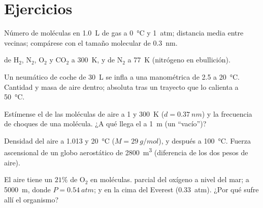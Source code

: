 \section{Ejercicios}

\begin{exercise}[$\star$]\label{exo:b1:kinetic-theory:1}
Número de moléculas en \qty{1.0}{L} de gas a \qty{0}{\degreeCelsius} y
\qty{1}{atm}; distancia media entre vecinas; compárese con el tamaño
molecular de \qty{0.3}{nm}.
\end{exercise}

\begin{exercise}[$\star$]\label{exo:b1:kinetic-theory:2}
 de H$_2$, N$_2$, O$_2$ y CO$_2$ a \qty{300}{K},
y de N$_2$ a \qty{77}{K} (nitrógeno en ebullición).
\end{exercise}

\begin{exercise}[$\star$]\label{exo:b1:kinetic-theory:3}
Un neumático de coche de \qty{30}{L} se infla a una  manométrica de
\qty{2.5}{} a \qty{20}{\degreeCelsius}. Cantidad y masa de aire dentro;
 absoluta tras un trayecto que lo calienta a \qty{50}{\degreeCelsius}.
\end{exercise}

\begin{exercise}[$\star$]\label{exo:b1:kinetic-theory:4}
Estímense el  de las moléculas de aire a \qty{1}{}
y \qty{300}{K} ($d = \qty{0.37}{nm}$) y la frecuencia de choques de una
molécula. ¿A qué  llega el  a \qty{1}{m} (un ``vacío'')?
\end{exercise}

\begin{exercise}[$\star\star$]\label{exo:b1:kinetic-theory:5}
Densidad del aire a \qty{1.013}{} y \qty{20}{\degreeCelsius}
($M = \qty{29}{g/mol}$), y después a \qty{100}{\degreeCelsius}. Fuerza
ascensional de un globo aerostático de \qty{2800}{m^3} (diferencia de los
dos pesos de aire).
\end{exercise}

\begin{exercise}[$\star\star$]\label{exo:b1:kinetic-theory:6}
El aire tiene un $21\%$ de O$_2$ en moléculas.  parcial del oxígeno
a nivel del mar; a \qty{5000}{m}, donde $P = \qty{0.54}{atm}$; y en la
cima del Everest (\qty{0.33}{atm}). ¿Por qué sufre allí el organismo?
\end{exercise}

